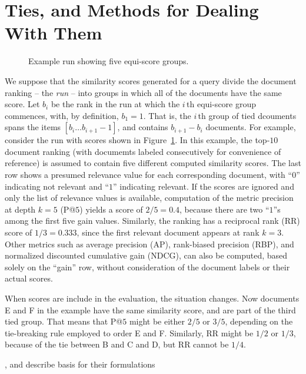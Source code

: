 \section{Ties, and Methods for Dealing With Them}
\label{sec-ties}


\begin{figure}[t]
\centering

\caption{Example run showing five equi-score groups.
\label{fig-example}}
\end{figure}

We suppose that the similarity scores generated for a query divide
the document ranking -- the {\emph{run}} -- into groups in which all
of the documents have the same score.
Let $b_i$ be the rank in the run at which the $i$\,th equi-score
group commences, with, by definition, $b_1=1$.
That is, the $i$\,th group of tied dcouments spans the items
$[b_i\ldots b_{i+1}-1]$, and contains $b_{i+1}-b_i$ documents.
For example, consider the run with scores shown in
Figure~\ref{fig-example}.
In this example, the top-$10$ document ranking (with documemts
labeled consecutively for convenience of reference) is assumed to
contain five different computed similarity scores.
The last row shows a presumed relevance value for each
corresponding document, with ``$0$'' indicating not relevant and
``$1$'' indicating relevant.
If the scores are ignored and only the list of relevance values is
available, computation of the metric precision at depth $k=5$ (P@$5$)
yields a score of $2/5=0.4$, because there are two ``$1$''s
among the first five gain values.
Similarly, the ranking has a reciprocal rank (RR) score of
$1/3=0.333$, since the first relevant document appears at rank $k=3$.
Other metrics such as average precision (AP), rank-biased precision
(RBP), and normalized discounted cumulative gain (NDCG), can also be
computed, based solely on the ``gain'' row, without consideration of
the document labels or their actual scores.

When scores are include in the evaluation, the situation changes.
Now documents E and F in the example have the same similarity score,
and are part of the third tied group.
That means that P@$5$ might be either $2/5$ or $3/5$, depending on
the tie-breaking rule employed to order E and F.
Similarly, RR might be $1/2$ or $1/3$, because of the tie between B
and C and D, but RR cannot be $1/4$.



{}




{\citet{mn08ecir}, and describe basis for their formulations}


{}

